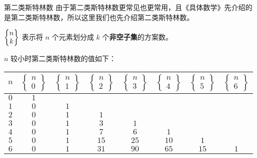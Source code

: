 \documentclass[UTF8]{beamer}
\begin{document}
    \begin{frame}{第二类斯特林数}
        由于第二类斯特林数更常见也更常用，且《具体数学》先介绍的是第二类斯特林数，所以这里我们也先介绍第二类斯特林数。

        $\St{n}{k}$ 表示将 $n$ 个元素划分成 $k$ 个\textbf{非空子集}的方案数。

        \pause
        $n$ 较小时第二类斯特林数的值如下：
        \begin{center}
        \begin{tabular}{|c|ccccccc|}
            \hline
             $n$ &  $\begin{Bmatrix}n\\0\end{Bmatrix}$  &   $\begin{Bmatrix}n\\1\end{Bmatrix}$    &            $\begin{Bmatrix}n\\2\end{Bmatrix}$   &$\begin{Bmatrix}n\\3\end{Bmatrix}$   &$\begin{Bmatrix}n\\4\end{Bmatrix}$   &   $\begin{Bmatrix}n\\5\end{Bmatrix}$   &$\begin{Bmatrix}n\\6\end{Bmatrix}$  
            \\\hline
            $0$&$1$&&&&&&\\\hline
            $1$&$0$&$1$&&&&&\\\hline
            $2$&$0$&$1$&$1$&&&&\\\hline
            $3$&$0$&$1$&$3$&$1$&&&\\\hline
            $4$&$0$&$1$&$7$&$6$&$1$&&\\\hline
            $5$&$0$&$1$&$15$&$25$&$10$&$1$&\\\hline
            $6$&$0$&$1$&$31$&$90$&$65$&$15$&$1$\\\hline
            \end{tabular}
        \end{center}
    \end{frame}
\end{document}
